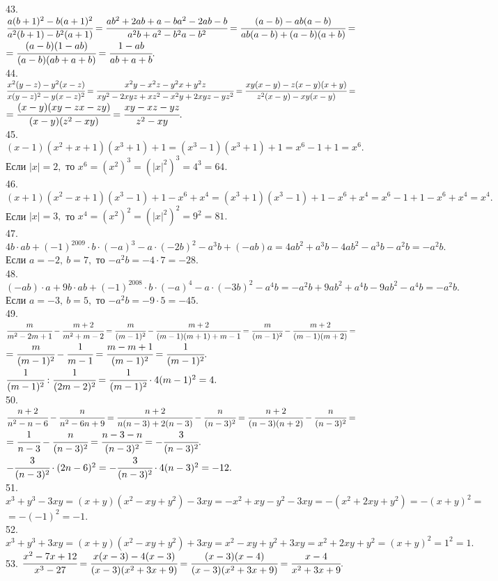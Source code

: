 43. $\cfrac{a(b+1)^2-b(a+1)^2}{a^2(b+1)-b^2(a+1)}=\cfrac{ab^2+2ab+a-ba^2-2ab-b}{a^2b+a^2-b^2a-b^2}=\cfrac{(a-b)-ab(a-b)}{ab(a-b)+(a-b)(a+b)}=$\\$=
\cfrac{(a-b)(1-ab)}{(a-b)(ab+a+b)}=\cfrac{1-ab}{ab+a+b}.$\\
44. $\cfrac{x^2(y-z)-y^2(x-z)}{x(y-z)^2-y(x-z)^2}=\cfrac{x^2y-x^2z-y^2x+y^2z}{xy^2-2xyz+xz^2-x^2y+2xyz-yz^2}=
\cfrac{xy(x-y)-z(x-y)(x+y)}{z^2(x-y)-xy(x-y)}=$\\$=\cfrac{(x-y)(xy-zx-zy)}{(x-y)(z^2-xy)}=\cfrac{xy-xz-yz}{z^2-xy}.$\\
45. $(x-1)(x^2+x+1)(x^3+1)+1=(x^3-1)(x^3+1)+1=x^6-1+1=x^6.$ Если $|x|=2,$ то $x^6=(x^2)^3=(|x|^2)^3=4^3=64.$\\
46. $(x+1)(x^2-x+1)(x^3-1)+1-x^6+x^4=(x^3+1)(x^3-1)+1-x^6+x^4=x^6-1+1-x^6+x^4=x^4.$ Если $|x|=3,$ то $x^4=(x^2)^2=(|x|^2)^2=9^2=81.$\\
47. $4b\cdot ab+(-1)^{2009}\cdot b\cdot(-a)^3-a\cdot(-2b)^2-a^3b+(-ab)a=4ab^2+a^3b-4ab^2-a^3b-a^2b=-a^2b.$ Если $a=-2,\ b=7,$ то
$-a^2b=-4\cdot7=-28.$\\
48. $(-ab)\cdot a+9b\cdot ab+(-1)^{2008}\cdot b\cdot(-a)^4-a\cdot (-3b)^2-a^4b=-a^2b+9ab^2+a^4b-9ab^2-a^4b=-a^2b.$ Если $a=-3,\ b=5,$ то
$-a^2b=-9\cdot5=-45.$\\
49. $\cfrac{m}{m^2-2m+1}-\cfrac{m+2}{m^2+m-2}=\cfrac{m}{(m-1)^2}-\cfrac{m+2}{(m-1)(m+1)+m-1}=
\cfrac{m}{(m-1)^2}-\cfrac{m+2}{(m-1)(m+2)}=$\\$=\cfrac{m}{(m-1)^2}-\cfrac{1}{m-1}=\cfrac{m-m+1}{(m-1)^2}=\cfrac{1}{(m-1)^2}.$\\
$\cfrac{1}{(m-1)^2}:\cfrac{1}{(2m-2)^2}=\cfrac{1}{(m-1)^2}\cdot4(m-1)^2=4.$\\
50. $\cfrac{n+2}{n^2-n-6}-\cfrac{n}{n^2-6n+9}=\cfrac{n+2}{n(n-3)+2(n-3)}-\cfrac{n}{(n-3)^2}=\cfrac{n+2}{(n-3)(n+2)}-\cfrac{n}{(n-3)^2}=$\\
$=\cfrac{1}{n-3}-\cfrac{n}{(n-3)^2}=\cfrac{n-3-n}{(n-3)^2}=-\cfrac{3}{(n-3)^2}.$\\
$-\cfrac{3}{(n-3)^2}\cdot(2n-6)^2=-\cfrac{3}{(n-3)^2}\cdot4(n-3)^2=-12.$\\
51. $x^3+y^3-3xy=(x+y)(x^2-xy+y^2)-3xy=-x^2+xy-y^2-3xy=-(x^2+2xy+y^2)=-(x+y)^2=$\\$=-(-1)^2=-1.$\\
52. $x^3+y^3+3xy=(x+y)(x^2-xy+y^2)+3xy=x^2-xy+y^2+3xy=x^2+2xy+y^2=(x+y)^2=1^2=1.$\\
53. $\cfrac{x^2-7x+12}{x^3-27}=\cfrac{x(x-3)-4(x-3)}{(x-3)(x^2+3x+9)}=\cfrac{(x-3)(x-4)}{(x-3)(x^2+3x+9)}=\cfrac{x-4}{x^2+3x+9}.$\\
